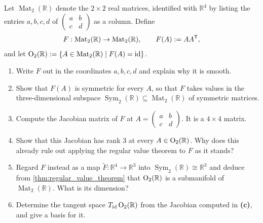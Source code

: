 \begin{exercise}
\label{ex:orthogonal_group_submanifold}
Let $\operatorname{Mat}_2(\mathbb{R})$ denote the $2\times 2$ real matrices, identified with
$\mathbb{R}^4$ by listing the entries $a,b,c,d$ of
$\left(\begin{smallmatrix} a & b \\ c & d\end{smallmatrix}\right)$ as a column. Define
\[F : \operatorname{Mat}_2(\mathbb{R}) \to \operatorname{Mat}_2(\mathbb{R}), \qquad
F(A) := AA^{\mathsf{T}},\]
and let $\operatorname{O}_2(\mathbb{R}) := \{A \in \operatorname{Mat}_2(\mathbb{R}) \mid F(A) = \operatorname{id}\}$.
\begin{enumerate}[label=\textbf{(\alph*)}]
  \item Write $F$ out in the coordinates $a,b,c,d$ and explain why it is smooth.
  \item Show that $F(A)$ is symmetric for every $A$, so that $F$ takes values in the
    three-dimensional subspace $\operatorname{Sym}_2(\mathbb{R}) \subseteq
    \operatorname{Mat}_2(\mathbb{R})$ of symmetric matrices.
  \item Compute the Jacobian matrix of $F$ at $A = \left(\begin{smallmatrix} a & b \\ c &
    d\end{smallmatrix}\right)$. It is a $4\times 4$ matrix.
  \item Show that this Jacobian has rank $3$ at every $A \in \operatorname{O}_2(\mathbb{R})$. Why does this
    already rule out applying the regular value theorem to $F$ as it stands?
  \item Regard $F$ instead as a map $\widetilde F : \mathbb{R}^4 \to \mathbb{R}^3$ into
    $\operatorname{Sym}_2(\mathbb{R}) \cong \mathbb{R}^3$ and deduce from
    \cref{thm:regular_value_theorem} that $\operatorname{O}_2(\mathbb{R})$ is a submanifold of
    $\operatorname{Mat}_2(\mathbb{R})$. What is its dimension?
  \item Determine the tangent space $T_{\operatorname{id}}\operatorname{O}_2(\mathbb{R})$ from the Jacobian computed in
    \textbf{(c)}, and give a basis for it.
\end{enumerate}
\end{exercise}

